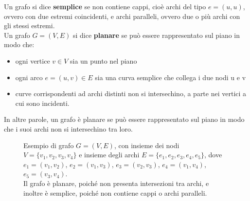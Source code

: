 \documentclass[a4paper,12pt,titlepage]{report}
\begin{document}
	\begin{dfn}
		Un grafo si dice {\bfseries semplice} se non contiene cappi, cioè archi del tipo $e = (u, u)$, ovvero con due estremi coincidenti, e archi paralleli, ovvero due o più archi con gli stessi estremi.
		\\Un grafo $G = (V, E)$ si dice {\bfseries planare} se può essere rappresentato sul piano in modo che:
		\begin{itemize}
			\item ogni vertice $v \in V$ sia un punto nel piano
			\item ogni arco $e = (u, v) \in E$ sia una curva semplice che collega i due nodi u e v
			\item curve corrispondenti ad archi distinti non si intersechino, a parte nei vertici a cui sono incidenti.
		\end{itemize}
		In altre parole, un grafo è planare se può essere rappresentato sul piano in modo che i suoi archi non si intersechino tra loro. 
	\end{dfn}
	\begin{figure}[h!]
		\centering
		\vspace{0.5cm}
		\caption{Esempio di grafo $G = (V, E)$, con insieme dei nodi $V = \{v_1, v_2, v_3, v_4\}$ e insieme degli archi $E = \{e_1, e_2, e_3, e_4, e_5\}$, dove $e_1=(v_1,v_2)$, $e_2=(v_1,v_3)$, $e_3=(v_2,v_3)$, $e_4=(v_1,v_4)$, $e_5=(v_3,v_4)$.
		\\Il grafo è planare, poiché non presenta intersezioni tra archi, e inoltre è semplice, poiché non contiene cappi o archi paralleli.}
	\end{figure}
	
\end{document}
